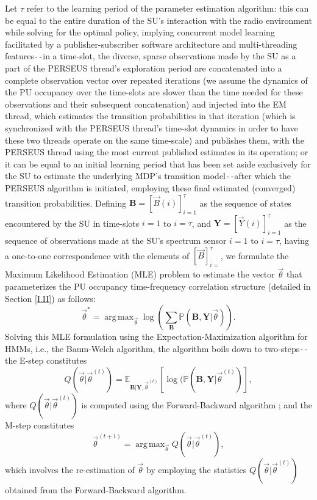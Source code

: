 \documentclass[12pt, draftcls, onecolumn]{IEEEtran}
\DeclareMathOperator*{\argmax}{arg\,max}
\begin{document}
Let $\tau$ refer to the learning period of the parameter estimation algorithm: this can be equal to the entire duration of the SU's interaction with the radio environment while solving for the optimal policy, implying concurrent model learning facilitated by a publisher-subscriber software architecture and multi-threading features\texttt{-{}-}in a time-slot, the diverse, sparse observations made by the SU as a part of the PERSEUS thread's exploration period are concatenated into a complete observation vector over repeated iterations (we assume the dynamics of the PU occupancy over the time-slots are slower than the time needed for these observations and their subsequent concatenation) and injected into the EM thread, which estimates the transition probabilities in that iteration (which is synchronized with the PERSEUS thread's time-slot dynamics in order to have these two threads operate on the same time-scale) and publishes them, with the PERSEUS thread using the most current published estimates in its operation; or it can  be equal to an initial learning period that has been set aside exclusively for the SU to estimate the underlying MDP's transition model\texttt{-{}-}after which the PERSEUS algorithm is initiated, employing these final estimated (converged) transition probabilities. Defining $\mathbf{B}{=}[\vec{B}(i)]_{i{=}1}^{\tau}$ as the sequence of states encountered by the SU in time-slots $i{=}1$ to $i{=}\tau$, and $\mathbf{Y}{=}[\vec{Y}(i)]_{i{=}1}^{\tau}$ as the sequence of observations made at the SU's spectrum sensor $i{=}1$ to $i{=}\tau$, having a one-to-one correspondence with the elements of $[\vec{B}]_{i{=}}^{\tau}$, we formulate the Maximum Likelihood Estimation (MLE) problem to estimate the vector $\vec{\theta}$ that parameterizes the PU occupancy time-frequency correlation structure (detailed in Section \ref{I.II}) as follows:
\begin{equation}\label{19}
    \vec{\theta}^{*}=\argmax_{\vec{\theta}}\log{\left(\sum_{\mathbf{B}}\mathbb{P}(\mathbf{B},\mathbf{Y}|\vec{\theta})\right)}.
\end{equation}
Solving this MLE formulation using the Expectation-Maximization algorithm \cite{WCL:14} for HMMs, i.e., the Baum-Welch algorithm, the algorithm boils down to two-steps\texttt{-{}-}the E-step constitutes
\begin{equation}\label{20}
    Q(\vec{\theta}|\vec{\theta}^{(t)})=\mathbb{E}_{\mathbf{B}|\mathbf{Y},\vec{\theta}^{(t)}}\left[\log{(\mathbb{P}(\mathbf{B},\mathbf{Y}|\vec{\theta}^{(t)})}\right],
\end{equation}
where $Q(\vec{\theta}|\vec{\theta}^{(t)})$ is computed using the Forward-Backward algorithm \cite{WCL:14}; and the M-step constitutes
\begin{equation}\label{21}
    \vec{\theta}^{(t+1)}=\argmax_{\vec{\theta}}Q(\vec{\theta}|\vec{\theta}^{(t)}),
\end{equation}
which involves the re-estimation of $\vec{\theta}$ by employing the statistics $Q(\vec{\theta}|\vec{\theta}^{(t)})$ obtained from the Forward-Backward algorithm.
\end{document}

